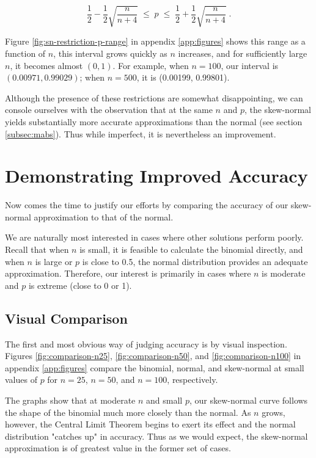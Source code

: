 \documentclass{article}
\begin{document}
\begin{equation}
 \frac12 - \frac12 \sqrt{\frac{n}{n+4}} \; \leq \; p \; \leq \; \frac12 + \frac12 \sqrt{\frac{n}{n+4}} \;.
\end{equation}

Figure \ref{fig:sn-restriction-p-range} in appendix \ref{app:figures} shows
this range as a function of $n$, this interval grows quickly as $n$ increases,
and for sufficiently large $n$, it becomes almost $(0, 1)$. For example, when
$n=100$, our interval is $(0.00971, 0.99029)$; when $n=500$, it is (0.00199,
0.99801).

Although the presence of these restrictions are somewhat disappointing, we can
console ourselves with the observation that at the same $n$ and $p$, the
skew-normal yields substantially more accurate approximations than the normal
(see section \ref{subsec:mabs}). Thus while imperfect, it is nevertheless an
improvement.

\section{Demonstrating Improved Accuracy}
\label{sec:accuracy}

Now comes the time to justify our efforts by comparing the accuracy of our
skew-normal approximation to that of the normal.

We are naturally most interested in cases where other solutions perform poorly.
Recall that when $n$ is small, it is feasible to calculate the binomial
directly, and when $n$ is large or $p$ is close to 0.5, the normal distribution
provides an adequate approximation. Therefore, our interest is primarily in
cases where $n$ is moderate and $p$ is extreme (close to 0 or 1).\footnotemark


\subsection{Visual Comparison}

The first and most obvious way of judging accuracy is by visual inspection.
Figures \ref{fig:comparison-n25}, \ref{fig:comparison-n50}, and
\ref{fig:comparison-n100} in appendix \ref{app:figures} compare the binomial,
normal, and skew-normal at small values of $p$ for $n=25$, $n=50$, and $n=100$,
respectively.

The graphs show that at moderate $n$ and small $p$, our skew-normal curve
follows the shape of the binomial much more closely than the normal. As $n$
grows, however, the Central Limit Theorem begins to exert its effect and the
normal distribution "catches up" in accuracy. Thus as we would expect, the
skew-normal approximation is of greatest value in the former set of cases.
\end{document}
